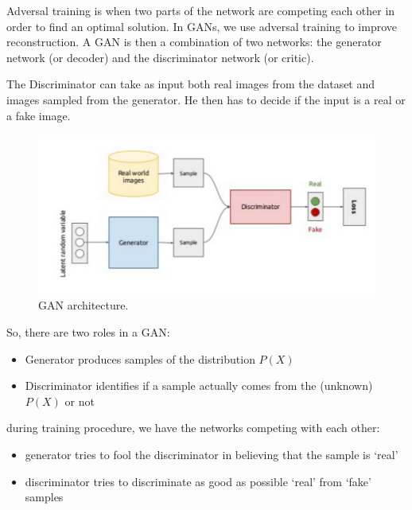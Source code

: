 Adversal training is when two parts of the network are competing each other in order to find an optimal solution. In GANs, we use adversal training to improve reconstruction. A GAN is then a combination of two networks: the generator network (or decoder) and the discriminator network (or critic).

The Discriminator can take as input both  real images from the dataset and images sampled from the generator. He then has to decide if the input is a real or a fake image.

\begin{figure}[H]
    \centering
    \includegraphics[width=12cm]{images/DimRed/GAN.png}
    \caption{GAN architecture.}
    \label{fig:non-linear-manifold}
\end{figure}

So, there are two roles in a GAN:
\begin{itemize}
    \item Generator produces samples of the distribution $P(X)$
    \item Discriminator identifies if a sample actually comes from the (unknown) $P(X)$ or not
\end{itemize}

during training procedure, we have the networks competing with each other:
\begin{itemize}
    \item generator tries to fool the discriminator in believing that the sample is ‘real’
    \item discriminator tries to discriminate as good as possible ‘real’ from ‘fake’ samples
\end{itemize}

